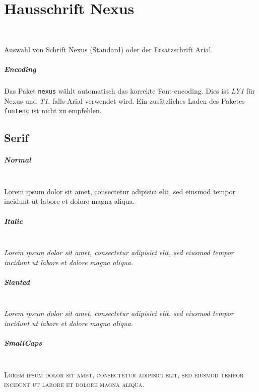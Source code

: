 \chapter{Hausschrift Nexus}\label{chap:nexus}

\begin{Declaration}
  \\
\end{Declaration}

Auswahl von Schrift Nexus (Standard) oder der Ersatzschrift Arial.

\paragraph{Encoding}

Das Paket \texttt{nexus} wählt automatisch das korrekte Font-encoding.
Dies ist \emph{LY1} für Nexus und \emph{T1}, falls Arial verwendet wird.
Ein zusätzliches Laden des Paketes \texttt{fontenc} ist nicht zu empfehlen.

\section*{Serif}

\paragraph{Normal}\hfill\\
{
Lorem ipsum dolor sit amet, consectetur adipisici elit, sed eiusmod tempor
incidunt ut labore et dolore magna aliqua.}
\paragraph{Italic}\hfill\\
{\itshape
Lorem ipsum dolor sit amet, consectetur adipisici elit, sed eiusmod tempor
incidunt ut labore et dolore magna aliqua.}
\paragraph{Slanted}\hfill\\
{\slshape
Lorem ipsum dolor sit amet, consectetur adipisici elit, sed eiusmod tempor
incidunt ut labore et dolore magna aliqua.}
\paragraph{SmallCaps}\hfill\\
{\scshape
Lorem ipsum dolor sit amet, consectetur adipisici elit, sed eiusmod tempor
incidunt ut labore et dolore magna aliqua.}

